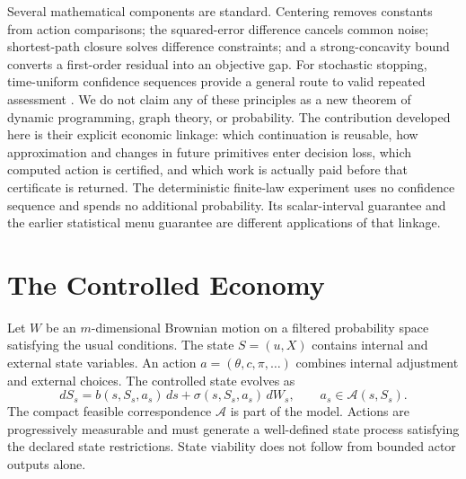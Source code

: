 \documentclass[ecta,nameyear,draft]{econsocart}
\theoremstyle{definition}
\theoremstyle{remark}
\newcommand{\Act}{\mathcal A}
\begin{document}
Several mathematical components are standard. Centering removes constants
from action comparisons; the squared-error difference cancels common noise;
shortest-path closure solves difference constraints; and a strong-concavity
bound converts a first-order residual into an objective gap. For stochastic
stopping, time-uniform confidence sequences provide a general route to valid
repeated assessment \citep{howard2021}. We do not claim any of these principles
as a new theorem of dynamic programming, graph theory, or probability. The
contribution developed here is their explicit economic linkage: which
continuation is reusable, how approximation and changes in future primitives
enter decision loss, which computed action is certified, and which work is
actually paid before that certificate is returned. The deterministic finite-law
experiment uses no confidence sequence and spends no additional probability.
Its scalar-interval guarantee and the earlier statistical menu guarantee
are different applications of that linkage.

\section{The Controlled Economy}\label{sec:model}
Let $W$ be an $m$-dimensional Brownian motion on a filtered probability space satisfying the usual conditions. The state $S=(u,X)$ contains internal and external state variables. An action $a=(\theta,c,\pi,\ldots)$ combines internal adjustment and external choices. The controlled state evolves as
\begin{equation}\label{eq:state}
 dS_s=b(s,S_s,a_s)\,ds+\sigma(s,S_s,a_s)\,dW_s,
 \qquad a_s\in\Act(s,S_s).
\end{equation}
The compact feasible correspondence $\Act$ is part of the model. Actions are progressively measurable and must generate a well-defined state process satisfying the declared state restrictions. State viability does not follow from bounded actor outputs alone.
\end{document}
